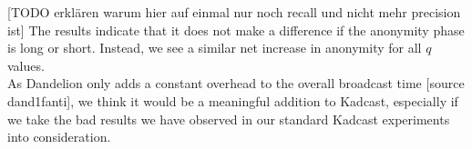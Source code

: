 [TODO erklären warum hier auf einmal nur noch recall und nicht mehr
precision ist]
The results indicate that it does not make a
difference if the anonymity phase is long or short. Instead, we see a
similar net increase in anonymity for all $q$ values. \\
As Dandelion only adds a constant overhead to the overall broadcast time [source
dand1fanti], we think it would be a meaningful addition to Kadcast,
especially if we take the bad results we have observed in our standard
Kadcast experiments into consideration.
